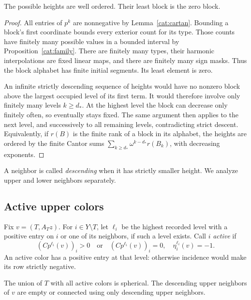 \begin{lemma}
\label{ht:well-order}
The possible heights are well ordered.  Their least block is the zero
block.
\end{lemma}

\begin{proof}
All entries of \(p^k\) are nonnegative by Lemma~\ref{cat:cartan}.
Bounding a block's first
coordinate bounds every exterior count for its type.  Those counts
have finitely many possible values in a bounded interval by
Proposition~\ref{cat:family}.  There are
finitely many types, their harmonic interpolations are fixed linear
maps, and there are finitely many sign masks.
Thus the block alphabet has finite initial segments.  Its least
element is zero.

An infinite strictly descending sequence of heights would have no
nonzero block above the largest occupied level of its first term.
It would therefore involve only finitely many levels \(k\ge d_*\).
At the highest level the block can decrease only finitely often, so
eventually stays fixed.  The same argument then applies to the next
level, and successively to all remaining levels, contradicting strict
descent.  Equivalently, if \(r(B)\) is the finite rank of a block in its
alphabet, the heights are ordered by the finite Cantor sums
\(\sum_{k\ge d_*}\omega^{k-d_*}r(B_k)\), with decreasing exponents.
\end{proof}

A neighbor is called \emph{descending} when it has strictly smaller
height.  We analyze upper and lower neighbors separately.

\subsection{Active upper colors}

Fix \(v=(T,A_Tz)\).  For \(i\in Y\setminus T\), let \(\ell_i\) be the
highest recorded level with a positive entry on \(i\) or one of its
neighbors, if such a level exists.  Call \(i\) \emph{active} if
\begin{equation}
 (Cp^{\ell_i}(v))_i>0
 \quad\text{or}\quad
 (Cp^{\ell_i}(v))_i=0,\quad \eta_i^{\ell_i}(v)=-1.
 \label{ht:active}
\end{equation}
An active color has a positive entry at that level: otherwise incidence
would make its row strictly negative.

\begin{lemma}
\label{ht:upper}
The union of \(T\) with all active colors is spherical.
The descending upper neighbors of \(v\) are empty or connected using
only descending upper neighbors.
\end{lemma}

